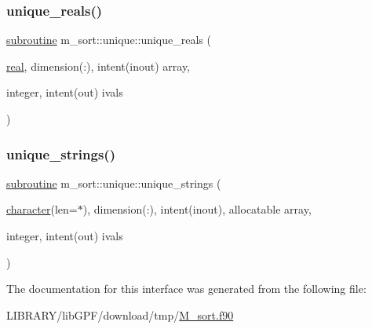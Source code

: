 \subsubsection{\texorpdfstring{unique\+\_\+reals()}{unique\_reals()}}
{\footnotesize\ttfamily \hyperlink{M__stopwatch_83_8txt_acfbcff50169d691ff02d4a123ed70482}{subroutine} m\+\_\+sort\+::unique\+::unique\+\_\+reals (\begin{DoxyParamCaption}\item[{\hyperlink{read__watch_83_8txt_abdb62bde002f38ef75f810d3a905a823}{real}, dimension(\+:), intent(inout)}]{array,  }\item[{integer, intent(out)}]{ivals }\end{DoxyParamCaption})\hspace{0.3cm}{\ttfamily [private]}}

\mbox{\label{interfacem__sort_1_1unique_a9efcc29118dee81c51f93c60d6089e6f}} 
\subsubsection{\texorpdfstring{unique\+\_\+strings()}{unique\_strings()}}
{\footnotesize\ttfamily \hyperlink{M__stopwatch_83_8txt_acfbcff50169d691ff02d4a123ed70482}{subroutine} m\+\_\+sort\+::unique\+::unique\+\_\+strings (\begin{DoxyParamCaption}\item[{\hyperlink{option__stopwatch_83_8txt_abd4b21fbbd175834027b5224bfe97e66}{character}(len=$\ast$), dimension(\+:), intent(inout), allocatable}]{array,  }\item[{integer, intent(out)}]{ivals }\end{DoxyParamCaption})\hspace{0.3cm}{\ttfamily [private]}}



The documentation for this interface was generated from the following file\+:\begin{DoxyCompactItemize}
\item 
L\+I\+B\+R\+A\+R\+Y/lib\+G\+P\+F/download/tmp/\hyperlink{M__sort_8f90}{M\+\_\+sort.\+f90}\end{DoxyCompactItemize}
